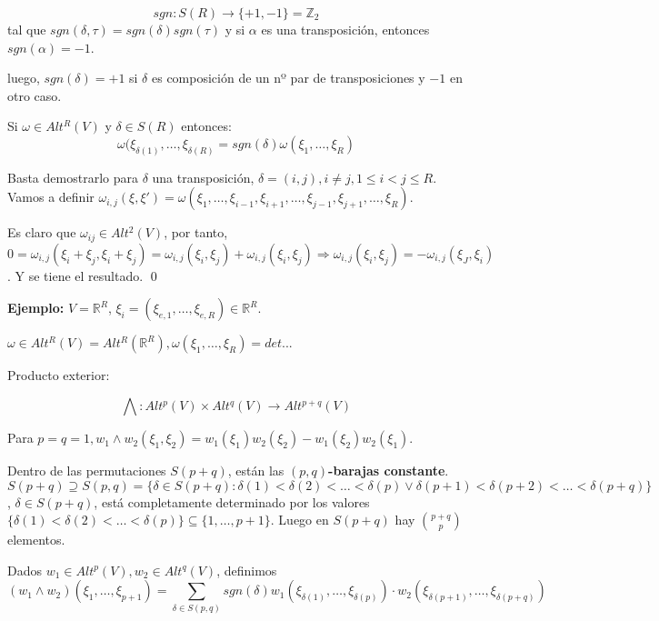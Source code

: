 $$sgn:S(R)\rightarrow \{+1,-1\}=\mathbb{Z}_2$$
tal que $sgn(\delta,\tau)=sgn(\delta)sgn(\tau)$ y si $\alpha $ es una transposición, entonces $sgn(\alpha )=-1$.

luego, $sgn(\delta )=+1$ si $\delta$ es composición de un nº par de transposiciones y $-1$ en otro caso. 

\begin{Lem}
Si $\omega \in Alt^R(V)$ y $\delta \in S(R)$ entonces:
$$ \omega(\xi_{\delta(1)},\dots , \xi_{\delta(R)} =sgn(\delta) \omega (\xi_1,\dots , \xi_R)$$
\end{Lem} 

\begin{Dem}
Basta demostrarlo para $\delta$ una transposición, $\delta =(i,j), i\neq j, 1 \le i < j \le R$. Vamos a definir $\omega_{i,j}(\xi,\xi')= \omega(\xi_1,\dots, \xi_{i-1},\xi_{i+1},\dots , \xi_{j-1},\xi_{j+1},\dots , \xi_R)$.

Es claro que $\omega_{ij}\in Alt^2(V)$, por tanto, $0=\omega_{i,j}(\xi_i+\xi_j,\xi_i+\xi_j)=\omega_{i,j}(\xi_i,\xi_j)+\omega_{i,j}(\xi_i,\xi_j)\Rightarrow \omega_{i,j}(\xi_i,\xi_j)=-\omega_{i,j}(\xi_J,\xi_i)$. Y se tiene el resultado. \qed
\end{Dem}


\textbf{Ejemplo:} $V=\mathbb{R}^R$, $\xi_i=(\xi_{e,1},\dots, \xi_{e,R})\in \mathbb{R}^R$.

$\omega\in Alt^R(V)=Alt^R(\mathbb{R}^R), \omega(\xi_1,\dots, \xi_R)= det...$

\begin{Def}
Producto exterior:

$$\bigwedge : Alt^p(V)\times Alt^q(V)\rightarrow Alt^{p+q}(V)$$

\end{Def}

Para $p=q=1, w_1\wedge w_2(\xi_1,\xi_2)=w_1(\xi_1)w_2(\xi_2)-w_1(\xi_2)w_2(\xi_1)$.


\begin{nota}
Dentro de las permutaciones $S(p+q)$, están las \textbf{$(p,q)$-barajas constante}.  $S(p+q)\supseteq S(p,q)=\{\delta \in S(p+q): \delta(1)<\delta(2)<\dots < \delta(p) \vee \delta(p+1)<\delta(p+2)<\dots <\delta(p+q)\}$, $\delta\in S(p+q)$, está completamente determinado por los valores $\{ \delta(1)<\delta(2)<\dots < \delta(p)\}\subseteq \{1,\dots, p+1\}$. Luego en $S(p+q)$ hay $\binom{p+q}{p}$ elementos.
\end{nota}

\begin{Def}
Dados $w_1\in Alt^p(V), w_2\in Alt^q(V)$, definimos
$$(w_1\wedge w_2)(\xi_1,\dots , \xi_{p+1})=\sum_{\delta\in S(p,q)} sgn(\delta) w_1(\xi_{\delta(1)},\dots , \xi_{\delta(p)})\cdot w_2(\xi_{\delta(p+1)},\dots, \xi_{\delta(p+q)})$$
\end{Def}


